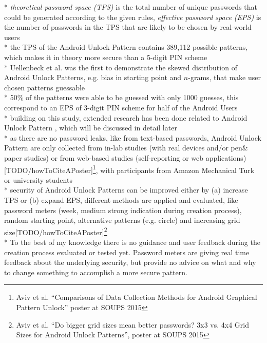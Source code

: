 \documentclass[twocolumn, a4paper, 10pt]{article}
\begin{document}
* \textit{theoretical password space (TPS)} is the total number of unique passwords that could be generated according to the given rules, \textit{effective password space (EPS)}  is the number of passwords in the TPS that are likely to be chosen by real-world users\cite{forget2007persuasion}\\
* the TPS of the Android Unlock Pattern contains 389,112 possible patterns\cite{Aviv:2010:SAS:1925004.1925009}, which makes it in theory more secure than a 5-digit PIN scheme\\
* Uellenbeck et al.\cite{Uellenbeck:2013:QSG:2508859.2516700} was the first to demonstrate the skewed distribution of Android Unlock Patterns, e.g. bias in starting point and $n$-grams, that make user chosen patterns guessable\\
* 50\% of the patterns were able to be guessed with only 1000 guesses, this correspond to an EPS of 3-digit PIN scheme for half of the Android Users\\
* building on this study, extended research has been done related to Android Unlock Pattern\cite{Sun2014308}\cite{siadati2015fortifying}\cite{Aviv:2014:UVP:2664243.2664253}\cite{Andriotis:2013:PSS:2462096.2462098} , which will be discussed in detail later\\
* as there are no password leaks, like from text-based passwords, Android Unlock Pattern are only collected from in-lab studies (with real devices and/or pen\& paper studies) or from web-based studies (self-reporting or web applications)[TODO/howToCiteAPoster]\footnote{Aviv et al. ``Comparisons of Data Collection Methods for Android Graphical Pattern Unlock'' poster at SOUPS 2015}, with participants from Amazon Mechanical Turk\cite{siadati2015fortifying}\cite{Aviv:2014:UVP:2664243.2664253} or university students\cite{Uellenbeck:2013:QSG:2508859.2516700}\cite{Sun2014308}\\
* security of Android Unlock Patterns can be improved either by (a) increase TPS or (b) expand EPS, different methods are applied and evaluated, like password meters (week, medium strong indication during creation process)\cite{Sun2014308}\cite{siadati2015fortifying}, random starting point\cite{siadati2015fortifying}, alternative patterns (e.g. circle) \cite{Uellenbeck:2013:QSG:2508859.2516700} and increasing grid size[TODO/howToCiteAPoster]\footnote{Aviv et al. ``Do bigger grid sizes mean better passwords? 3x3 vs. 4x4 Grid Sizes for Android Unlock Patterns'', poster at SOUPS 2015}\\
* To the best of my knowledge there is no guidance and user feedback during the creation process evaluated or tested yet. Password meters are giving real time feedback about the underlying security, but provide no advice on what and why to change something to accomplish a more secure pattern.\\
\end{document}
